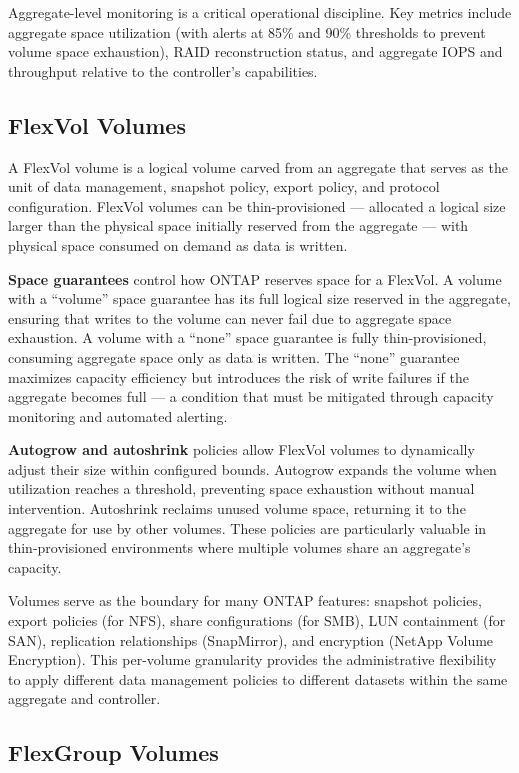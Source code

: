 Aggregate-level monitoring is a critical operational discipline. Key metrics include aggregate space utilization (with alerts at 85\% and 90\% thresholds to prevent volume space exhaustion), RAID reconstruction status, and aggregate IOPS and throughput relative to the controller's capabilities.

\subsection{FlexVol Volumes}

A FlexVol volume is a logical volume carved from an aggregate that serves as the unit of data management, snapshot policy, export policy, and protocol configuration. FlexVol volumes can be thin-provisioned --- allocated a logical size larger than the physical space initially reserved from the aggregate --- with physical space consumed on demand as data is written.

\textbf{Space guarantees} control how ONTAP reserves space for a FlexVol. A volume with a ``volume'' space guarantee has its full logical size reserved in the aggregate, ensuring that writes to the volume can never fail due to aggregate space exhaustion. A volume with a ``none'' space guarantee is fully thin-provisioned, consuming aggregate space only as data is written. The ``none'' guarantee maximizes capacity efficiency but introduces the risk of write failures if the aggregate becomes full --- a condition that must be mitigated through capacity monitoring and automated alerting.

\textbf{Autogrow and autoshrink} policies allow FlexVol volumes to dynamically adjust their size within configured bounds. Autogrow expands the volume when utilization reaches a threshold, preventing space exhaustion without manual intervention. Autoshrink reclaims unused volume space, returning it to the aggregate for use by other volumes. These policies are particularly valuable in thin-provisioned environments where multiple volumes share an aggregate's capacity.

Volumes serve as the boundary for many ONTAP features: snapshot policies, export policies (for NFS), share configurations (for SMB), LUN containment (for SAN), replication relationships (SnapMirror), and encryption (NetApp Volume Encryption). This per-volume granularity provides the administrative flexibility to apply different data management policies to different datasets within the same aggregate and controller.

\subsection{FlexGroup Volumes}


